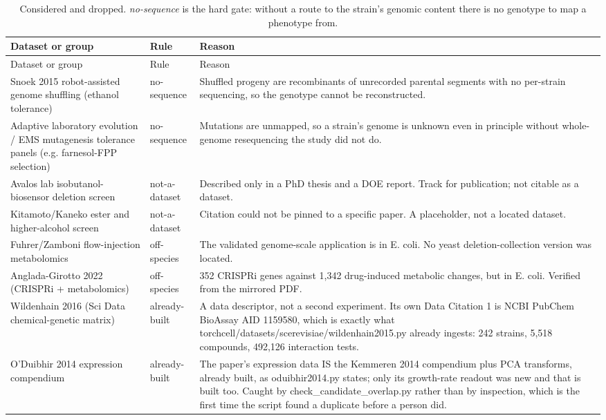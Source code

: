 \begingroup
\footnotesize
\begin{longtable}{@{}L{62mm} L{22mm} L{85mm}@{}}
\caption[]{Considered and dropped. \emph{no-sequence} is the hard gate: without a route to
the strain's genomic content there is no genotype to map a phenotype from.}
\label{tab:excluded}\\
\toprule
Dataset or group & Rule & Reason \\
\midrule
\endfirsthead
\toprule
Dataset or group & Rule & Reason \\
\midrule
\endhead
\bottomrule
\endfoot
Snoek 2015 robot-assisted genome shuffling (ethanol tolerance) & no-sequence & Shuffled progeny are recombinants of unrecorded parental segments with no per-strain sequencing, so the genotype cannot be reconstructed. \\
\addlinespace[5pt]
Adaptive laboratory evolution / EMS mutagenesis tolerance panels (e.g. farnesol-FPP selection) & no-sequence & Mutations are unmapped, so a strain's genome is unknown even in principle without whole-genome resequencing the study did not do. \\
\addlinespace[5pt]
Avalos lab isobutanol-biosensor deletion screen & not-a-dataset & Described only in a PhD thesis and a DOE report. Track for publication; not citable as a dataset. \\
\addlinespace[5pt]
Kitamoto/Kaneko ester and higher-alcohol screen & not-a-dataset & Citation could not be pinned to a specific paper. A placeholder, not a located dataset. \\
\addlinespace[5pt]
Fuhrer/Zamboni flow-injection metabolomics & off-species & The validated genome-scale application is in E. coli. No yeast deletion-collection version was located. \\
\addlinespace[5pt]
Anglada-Girotto 2022 (CRISPRi + metabolomics) & off-species & 352 CRISPRi genes against 1,342 drug-induced metabolic changes, but in E. coli. Verified from the mirrored PDF. \\
\addlinespace[5pt]
Wildenhain 2016 (Sci Data chemical-genetic matrix) & already-built & A data descriptor, not a second experiment. Its own Data Citation 1 is NCBI PubChem BioAssay AID 1159580, which is exactly what torchcell/datasets/scerevisiae/wildenhain2015.py already ingests: 242 strains, 5,518 compounds, 492,126 interaction tests. \\
\addlinespace[5pt]
O'Duibhir 2014 expression compendium & already-built & The paper's expression data IS the Kemmeren 2014 compendium plus PCA transforms, already built, as oduibhir2014.py states; only its growth-rate readout was new and that is built too. Caught by check\_candidate\_overlap.py rather than by inspection, which is the first time the script found a duplicate before a person did. \\

\end{longtable}
